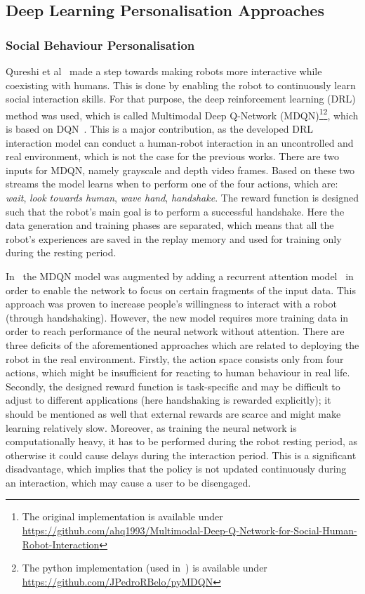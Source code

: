\documentclass[thesis]{mas_proposal}
\begin{document}
\subsection{Deep Learning Personalisation Approaches}

\subsubsection{Social Behaviour Personalisation}
Qureshi et al~\cite{Qureshi2016} made a step towards making robots more interactive while coexisting with humans. This is done by enabling the robot to continuously learn social interaction skills. For that purpose, the deep reinforcement learning (DRL) method was used, which is called Multimodal Deep Q-Network (MDQN)\footnote{The original implementation is available under \url{https://github.com/ahq1993/Multimodal-Deep-Q-Network-for-Social-Human-Robot-Interaction}}\footnote{The python implementation (used in~\cite{Belo2021}) is available under \url{https://github.com/JPedroRBelo/pyMDQN}}, which is based on DQN~\cite{mnih2015human}. This is a major contribution, as the developed DRL interaction model can conduct a human-robot interaction in an uncontrolled and real environment, which is not the case for the previous works. There are two inputs for MDQN, namely grayscale and depth video frames. Based on these two streams the model learns when to perform one of the four actions, which are: \emph{wait}, \emph{look towards human}, \emph{wave hand}, \emph{handshake}. The reward function is designed such that the robot's main goal is to perform a successful handshake. Here the data generation and training phases are separated, which means that all the robot's experiences are saved in the replay memory and used for training only during the resting period. 

In~\cite{Qureshi2017} the MDQN model was augmented by adding a recurrent attention model~\cite{sorokin2015deep} in order to enable the network to focus on certain fragments of the input data. This approach was proven to increase people's willingness to interact with a robot (through handshaking). However, the new model requires more training data in order to reach performance of the neural network without attention. There are three deficits of the aforementioned approaches which are related to deploying the robot in the real environment. Firstly, the action space consists only from four actions, which might be insufficient for reacting to human behaviour in real life. Secondly, the designed reward function is task-specific and may be difficult to adjust to different applications (here handshaking is rewarded explicitly); it should be mentioned as well that external rewards are scarce and might make learning relatively slow. Moreover, as training the neural network is computationally heavy, it has to be performed during the robot resting period, as otherwise it could cause delays during the interaction period. This is a significant disadvantage, which implies that the policy is not updated continuously during an interaction, which may cause a user to be disengaged. 
\end{document}

